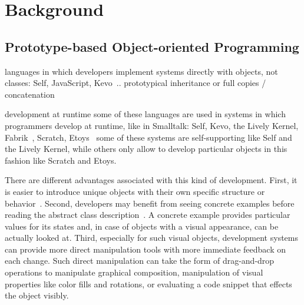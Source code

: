 \chapter{Background} \label{chapter:BACKGROUND}



\section{Prototype-based Object-oriented Programming}

languages in which developers implement systems directly with objects, not classes: Self, JavaScript, Kevo~\cite{Tailvalsaari1992Kevo}..
prototypical inheritance or full copies / concatenation


development at runtime
some of these languages are used in systems in which programmers develop at runtime, like in Smalltalk: Self, Kevo, the Lively Kernel, Fabrik~\cite{Ingalls1988FVP}, Scratch\cite{Maloney2010SPL}, Etoys~\cite{Kay2005Etoys}
some of these systems are self-supporting like Self and the Lively Kernel, while others only allow to develop particular objects in this fashion like Scratch and Etoys.



There are different advantages associated with this kind of development.
First, it is easier to introduce unique objects with their own specific structure or behavior~. 
Second, developers may benefit from seeing concrete examples before reading the abstract class description~.
A concrete example provides particular values for its states and, in case of objects with a visual appearance, can be actually looked at.
Third, especially for such visual objects, development systems can provide more direct manipulation tools with more immediate feedback on each change.
Such direct manipulation can take the form of drag-and-drop operations to manipulate graphical composition, manipulation of visual properties like color fills and rotations, or evaluating a code snippet that effects the object visibly.


